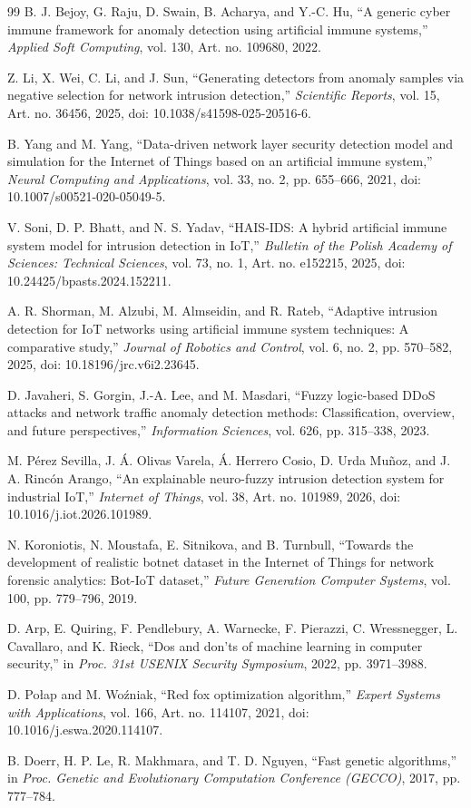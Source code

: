 \documentclass[11pt,a4paper]{article}
\begin{document}
\begin{thebibliography}{99}
 B. J. Bejoy, G. Raju, D. Swain, B. Acharya, and Y.-C. Hu, ``A generic cyber immune framework for anomaly detection using artificial immune systems,'' \emph{Applied Soft Computing}, vol. 130, Art. no. 109680, 2022.

 Z. Li, X. Wei, C. Li, and J. Sun, ``Generating detectors from anomaly samples via negative selection for network intrusion detection,'' \emph{Scientific Reports}, vol. 15, Art. no. 36456, 2025, doi: 10.1038/s41598-025-20516-6.

 B. Yang and M. Yang, ``Data-driven network layer security detection model and simulation for the Internet of Things based on an artificial immune system,'' \emph{Neural Computing and Applications}, vol. 33, no. 2, pp. 655--666, 2021, doi: 10.1007/s00521-020-05049-5.

 V. Soni, D. P. Bhatt, and N. S. Yadav, ``HAIS-IDS: A hybrid artificial immune system model for intrusion detection in IoT,'' \emph{Bulletin of the Polish Academy of Sciences: Technical Sciences}, vol. 73, no. 1, Art. no. e152215, 2025, doi: 10.24425/bpasts.2024.152211.

 A. R. Shorman, M. Alzubi, M. Almseidin, and R. Rateb, ``Adaptive intrusion detection for IoT networks using artificial immune system techniques: A comparative study,'' \emph{Journal of Robotics and Control}, vol. 6, no. 2, pp. 570--582, 2025, doi: 10.18196/jrc.v6i2.23645.

 D. Javaheri, S. Gorgin, J.-A. Lee, and M. Masdari, ``Fuzzy logic-based DDoS attacks and network traffic anomaly detection methods: Classification, overview, and future perspectives,'' \emph{Information Sciences}, vol. 626, pp. 315--338, 2023.

 M. Pérez Sevilla, J. Á. Olivas Varela, Á. Herrero Cosio, D. Urda Muñoz, and J. A. Rincón Arango, ``An explainable neuro-fuzzy intrusion detection system for industrial IoT,'' \emph{Internet of Things}, vol. 38, Art. no. 101989, 2026, doi: 10.1016/j.iot.2026.101989.

 N. Koroniotis, N. Moustafa, E. Sitnikova, and B. Turnbull, ``Towards the development of realistic botnet dataset in the Internet of Things for network forensic analytics: Bot-IoT dataset,'' \emph{Future Generation Computer Systems}, vol. 100, pp. 779--796, 2019.

 D. Arp, E. Quiring, F. Pendlebury, A. Warnecke, F. Pierazzi, C. Wressnegger, L. Cavallaro, and K. Rieck, ``Dos and don'ts of machine learning in computer security,'' in \emph{Proc. 31st USENIX Security Symposium}, 2022, pp. 3971--3988.

 D. Połap and M. Woźniak, ``Red fox optimization algorithm,'' \emph{Expert Systems with Applications}, vol. 166, Art. no. 114107, 2021, doi: 10.1016/j.eswa.2020.114107.

 B. Doerr, H. P. Le, R. Makhmara, and T. D. Nguyen, ``Fast genetic algorithms,'' in \emph{Proc. Genetic and Evolutionary Computation Conference (GECCO)}, 2017, pp. 777--784.

\end{thebibliography}
\end{document}

